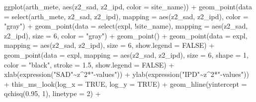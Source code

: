 \documentclass[
  letterpaper,
  DIV=11,
  numbers=noendperiod]{scrartcl}
\newenvironment{Shaded}{\begin{snugshade}}{\end{snugshade}}
\newcommand{\AttributeTok}[1]{\textcolor[rgb]{0.40,0.45,0.13}{#1}}
\newcommand{\ConstantTok}[1]{\textcolor[rgb]{0.56,0.35,0.01}{#1}}
\newcommand{\DecValTok}[1]{\textcolor[rgb]{0.68,0.00,0.00}{#1}}
\newcommand{\FloatTok}[1]{\textcolor[rgb]{0.68,0.00,0.00}{#1}}
\newcommand{\FunctionTok}[1]{\textcolor[rgb]{0.28,0.35,0.67}{#1}}
\newcommand{\NormalTok}[1]{\textcolor[rgb]{0.00,0.23,0.31}{#1}}
\newcommand{\SpecialCharTok}[1]{\textcolor[rgb]{0.37,0.37,0.37}{#1}}
\newcommand{\StringTok}[1]{\textcolor[rgb]{0.13,0.47,0.30}{#1}}
\begin{document}
\begin{Shaded}
\begin{Highlighting}[]
\FunctionTok{ggplot}\NormalTok{(arth\_mete, }\FunctionTok{aes}\NormalTok{(z2\_sad, z2\_ipd, }\AttributeTok{color =}\NormalTok{ site\_name)) }\SpecialCharTok{+}
    \FunctionTok{geom\_point}\NormalTok{(}\AttributeTok{data =} \FunctionTok{select}\NormalTok{(arth\_mete, z2\_sad, z2\_ipd),}
               \AttributeTok{mapping =} \FunctionTok{aes}\NormalTok{(z2\_sad, z2\_ipd), }\AttributeTok{color =} \StringTok{"gray"}\NormalTok{) }\SpecialCharTok{+}
    \FunctionTok{geom\_point}\NormalTok{(}\AttributeTok{data =} \FunctionTok{select}\NormalTok{(expl, }\SpecialCharTok{!}\NormalTok{site\_name), }
               \AttributeTok{mapping =} \FunctionTok{aes}\NormalTok{(z2\_sad, z2\_ipd), }
               \AttributeTok{size =} \DecValTok{6}\NormalTok{, }\AttributeTok{color =} \StringTok{"gray"}\NormalTok{) }\SpecialCharTok{+}
    \FunctionTok{geom\_point}\NormalTok{() }\SpecialCharTok{+}
    \FunctionTok{geom\_point}\NormalTok{(}\AttributeTok{data =}\NormalTok{ expl,}
               \AttributeTok{mapping =} \FunctionTok{aes}\NormalTok{(z2\_sad, z2\_ipd),}
               \AttributeTok{size =} \DecValTok{6}\NormalTok{,}
               \AttributeTok{show.legend =} \ConstantTok{FALSE}\NormalTok{) }\SpecialCharTok{+}
    \FunctionTok{geom\_point}\NormalTok{(}\AttributeTok{data =}\NormalTok{ expl,}
               \AttributeTok{mapping =} \FunctionTok{aes}\NormalTok{(z2\_sad, z2\_ipd),}
               \AttributeTok{size =} \DecValTok{6}\NormalTok{, }\AttributeTok{shape =} \DecValTok{1}\NormalTok{, }\AttributeTok{color =} \StringTok{"black"}\NormalTok{,}
               \AttributeTok{stroke =} \FloatTok{1.5}\NormalTok{,}
               \AttributeTok{show.legend =} \ConstantTok{FALSE}\NormalTok{) }\SpecialCharTok{+}
    \FunctionTok{xlab}\NormalTok{(}\FunctionTok{expression}\NormalTok{(}\StringTok{"SAD"}\SpecialCharTok{\textasciitilde{}}\NormalTok{z}\SpecialCharTok{\^{}}\DecValTok{2}\SpecialCharTok{*}\StringTok{"{-}values"}\NormalTok{)) }\SpecialCharTok{+}
    \FunctionTok{ylab}\NormalTok{(}\FunctionTok{expression}\NormalTok{(}\StringTok{"IPD"}\SpecialCharTok{\textasciitilde{}}\NormalTok{z}\SpecialCharTok{\^{}}\DecValTok{2}\SpecialCharTok{*}\StringTok{"{-}values"}\NormalTok{)) }\SpecialCharTok{+}
    \FunctionTok{this\_ms\_look}\NormalTok{(}\AttributeTok{log\_x =} \ConstantTok{TRUE}\NormalTok{, }\AttributeTok{log\_y =} \ConstantTok{TRUE}\NormalTok{) }\SpecialCharTok{+}
    \FunctionTok{geom\_hline}\NormalTok{(}\AttributeTok{yintercept =} \FunctionTok{qchisq}\NormalTok{(}\FloatTok{0.95}\NormalTok{, }\DecValTok{1}\NormalTok{), }\AttributeTok{linetype =} \DecValTok{2}\NormalTok{) }\SpecialCharTok{+}

\end{Highlighting}
\end{Shaded}
\end{document}
